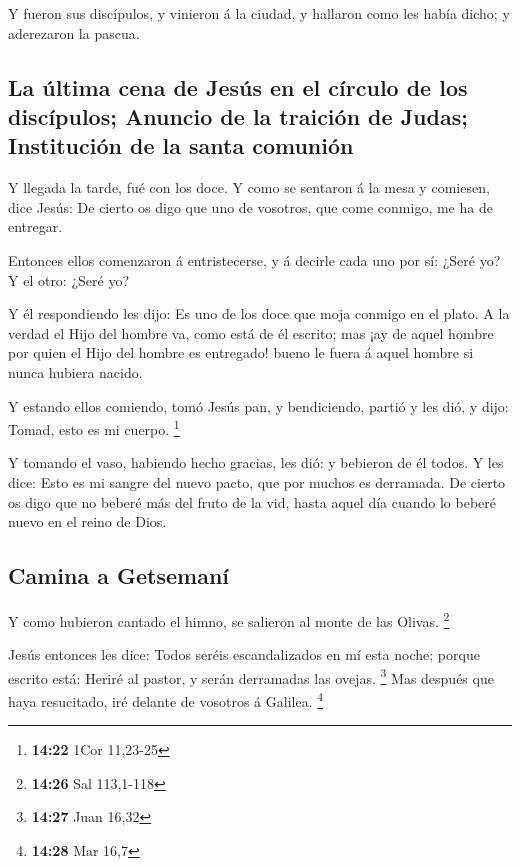  Y fueron sus discípulos, y vinieron á la ciudad, y
hallaron como les había dicho; y aderezaron la pascua.

\hypertarget{la-uxfaltima-cena-de-jesuxfas-en-el-cuxedrculo-de-los-discuxedpulos-anuncio-de-la-traiciuxf3n-de-judas-instituciuxf3n-de-la-santa-comuniuxf3n}{%
\subsection{La última cena de Jesús en el círculo de los discípulos;
Anuncio de la traición de Judas; Institución de la santa
comunión}\label{la-uxfaltima-cena-de-jesuxfas-en-el-cuxedrculo-de-los-discuxedpulos-anuncio-de-la-traiciuxf3n-de-judas-instituciuxf3n-de-la-santa-comuniuxf3n}}

 Y llegada la tarde, fué con los doce.  Y
como se sentaron á la mesa y comiesen, dice Jesús: De cierto os digo que
uno de vosotros, que come conmigo, me ha de entregar.

 Entonces ellos comenzaron á entristecerse, y á decirle
cada uno por sí: ¿Seré yo? Y el otro: ¿Seré yo?

 Y él respondiendo les dijo: Es uno de los doce que moja
conmigo en el plato.  A la verdad el Hijo del hombre va,
como está de él escrito; mas ¡ay de aquel hombre por quien el Hijo del
hombre es entregado! bueno le fuera á aquel hombre si nunca hubiera
nacido.

 Y estando ellos comiendo, tomó Jesús pan, y bendiciendo,
partió y les dió, y dijo: Tomad, esto es mi cuerpo. \footnote{\textbf{14:22}
  1Cor 11,23-25}

 Y tomando el vaso, habiendo hecho gracias, les dió: y
bebieron de él todos.  Y les dice: Esto es mi sangre del
nuevo pacto, que por muchos es derramada.  De cierto os
digo que no beberé más del fruto de la vid, hasta aquel día cuando lo
beberé nuevo en el reino de Dios.

\hypertarget{camina-a-getsemanuxed}{%
\subsection{Camina a Getsemaní}\label{camina-a-getsemanuxed}}

 Y como hubieron cantado el himno, se salieron al monte
de las Olivas. \footnote{\textbf{14:26} Sal 113,1-118}

 Jesús entonces les dice: Todos seréis escandalizados en
mí esta noche; porque escrito está: Heriré al pastor, y serán derramadas
las ovejas. \footnote{\textbf{14:27} Juan 16,32}  Mas
después que haya resucitado, iré delante de vosotros á Galilea.
\footnote{\textbf{14:28} Mar 16,7}

